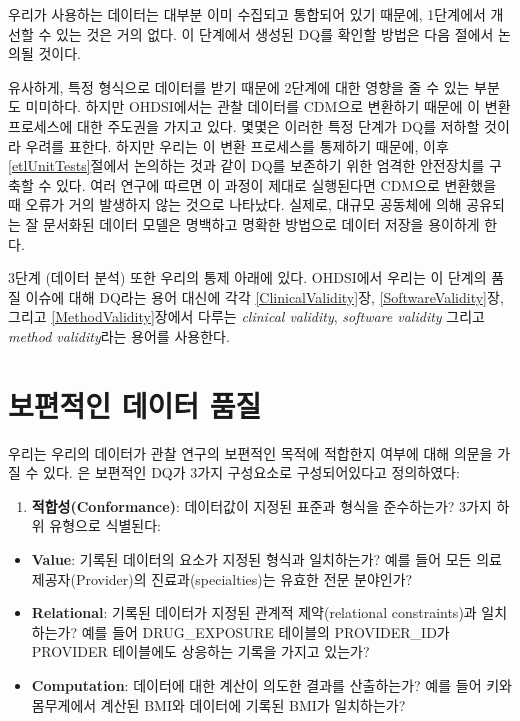 \documentclass[10.5pt]{book}
\providecommand{\tightlist}{%
  \setlength{\itemsep}{0pt}\setlength{\parskip}{0pt}}
\theoremstyle{definition}
\theoremstyle{definition}
\theoremstyle{definition}
\theoremstyle{remark}
\begin{document}
우리가 사용하는 데이터는 대부분 이미 수집되고 통합되어 있기 때문에,
1단계에서 개선할 수 있는 것은 거의 없다. 이 단계에서 생성된 DQ를 확인할
방법은 다음 절에서 논의될 것이다.

유사하게, 특정 형식으로 데이터를 받기 때문에 2단계에 대한 영향을 줄 수
있는 부분도 미미하다. 하지만 OHDSI에서는 관찰 데이터를 CDM으로 변환하기
때문에 이 변환 프로세스에 대한 주도권을 가지고 있다. 몇몇은 이러한 특정
단계가 DQ를 저하할 것이라 우려를 표한다. 하지만 우리는 이 변환
프로세스를 통제하기 때문에, 이후 \ref{etlUnitTests}절에서 논의하는 것과
같이 DQ를 보존하기 위한 엄격한 안전장치를 구축할 수 있다. 여러
연구\citep{defalco_2013, makadia_2014, matcho_2014, voss_2015, voss_2015b, hripcsak_2018}에
따르면 이 과정이 제대로 실행된다면 CDM으로 변환했을 때 오류가 거의
발생하지 않는 것으로 나타났다. 실제로, 대규모 공동체에 의해 공유되는 잘
문서화된 데이터 모델은 명백하고 명확한 방법으로 데이터 저장을 용이하게
한다.

3단계 (데이터 분석) 또한 우리의 통제 아래에 있다. OHDSI에서 우리는 이
단계의 품질 이슈에 대해 DQ라는 용어 대신에 각각
\ref{ClinicalValidity}장, \ref{SoftwareValidity}장, 그리고
\ref{MethodValidity}장에서 다루는 \emph{clinical validity},
\emph{software validity} 그리고 \emph{method validity}라는 용어를
사용한다.

\section{보편적인 데이터 품질}\label{--}

우리는 우리의 데이터가 관찰 연구의 보편적인 목적에 적합한지 여부에 대해
의문을 가질 수 있다. \citet{kahn_harmonized_2016} 은 보편적인 DQ가 3가지
구성요소로 구성되어있다고 정의하였다:

\begin{enumerate}
\def\labelenumi{\arabic{enumi}.}
\tightlist
\item
  \textbf{적합성(Conformance)}: 데이터값이 지정된 표준과 형식을
  준수하는가? 3가지 하위 유형으로 식별된다:
\end{enumerate}

\begin{itemize}
\tightlist
\item
  \textbf{Value}: 기록된 데이터의 요소가 지정된 형식과 일치하는가? 예를
  들어 모든 의료 제공자(Provider)의 진료과(specialties)는 유효한 전문
  분야인가?
\item
  \textbf{Relational}: 기록된 데이터가 지정된 관계적 제약(relational
  constraints)과 일치하는가? 예를 들어 DRUG\_EXPOSURE 테이블의
  PROVIDER\_ID가 PROVIDER 테이블에도 상응하는 기록을 가지고 있는가?
\item
  \textbf{Computation}: 데이터에 대한 계산이 의도한 결과를 산출하는가?
  예를 들어 키와 몸무게에서 계산된 BMI와 데이터에 기록된 BMI가
  일치하는가?
\end{itemize}
\end{document}
